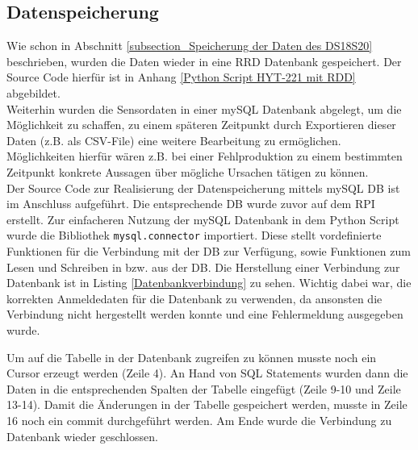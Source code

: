 \subsection{Datenspeicherung}
\label{subsection_Datenspeicherung_HYT221}
Wie schon in Abschnitt \ref{subsection_Speicherung der Daten des DS18S20} beschrieben, wurden die Daten wieder in eine RRD Datenbank gespeichert. Der Source Code hierfür ist in Anhang \ref{Python Script HYT-221 mit RDD} abgebildet.\\
Weiterhin wurden die Sensordaten in einer mySQL Datenbank abgelegt, um die Möglichkeit zu schaffen, zu einem späteren Zeitpunkt durch Exportieren dieser Daten (z.B. als CSV-File) eine weitere Bearbeitung zu ermöglichen. Möglichkeiten hierfür wären z.B. bei einer Fehlproduktion zu einem bestimmten Zeitpunkt konkrete Aussagen über mögliche Ursachen tätigen zu können.\\
Der Source Code zur Realisierung der Datenspeicherung mittels mySQL DB ist im Anschluss aufgeführt. Die entsprechende DB wurde zuvor auf dem \ac{RPI} erstellt. Zur einfacheren Nutzung der mySQL Datenbank in dem Python Script wurde die Bibliothek \texttt{mysql.connector} importiert. Diese stellt vordefinierte Funktionen für die Verbindung mit der DB zur Verfügung, sowie Funktionen zum Lesen und Schreiben in bzw. aus der DB. Die Herstellung einer Verbindung zur Datenbank ist in Listing \ref{Datenbankverbindung} zu sehen.
Wichtig dabei war, die korrekten Anmeldedaten für die Datenbank zu verwenden, da ansonsten die Verbindung nicht hergestellt werden konnte und eine Fehlermeldung ausgegeben wurde.



Um auf die Tabelle in der Datenbank zugreifen zu können musste noch ein Cursor erzeugt werden (Zeile 4). An Hand von SQL Statements wurden dann die Daten in die entsprechenden Spalten der Tabelle eingefügt (Zeile 9-10 und Zeile 13-14). Damit die Änderungen in der Tabelle gespeichert werden, musste in Zeile 16 noch ein commit durchgeführt werden. Am Ende wurde die Verbindung zu Datenbank wieder geschlossen.




